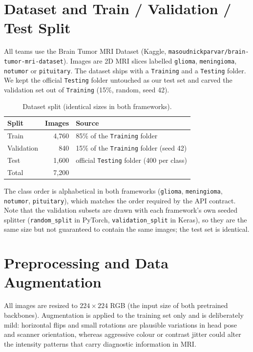 \documentclass[11pt,a4paper]{article}
\begin{document}
\section{Dataset and Train / Validation / Test Split}
All teams use the Brain Tumor MRI Dataset (Kaggle, \texttt{masoudnickparvar/brain-tumor-mri-dataset}). Images are 2D MRI slices labelled \texttt{glioma}, \texttt{meningioma}, \texttt{notumor} or \texttt{pituitary}. The dataset ships with a \texttt{Training} and a \texttt{Testing} folder. We kept the official \texttt{Testing} folder untouched as our test set and carved the validation set out of \texttt{Training} (15\%, random, seed 42).

\begin{table}[H]
\centering
\caption{Dataset split (identical sizes in both frameworks).}
\label{tab:split}
\begin{tabular}{lrl}
\toprule
Split & Images & Source \\
\midrule
Train      & 4{,}760 & 85\% of the \texttt{Training} folder \\
Validation &   840   & 15\% of the \texttt{Training} folder (seed 42) \\
Test       & 1{,}600 & official \texttt{Testing} folder (400 per class) \\
\midrule
Total      & 7{,}200 & \\
\bottomrule
\end{tabular}
\end{table}

\noindent The class order is alphabetical in both frameworks (\texttt{glioma}, \texttt{meningioma}, \texttt{notumor}, \texttt{pituitary}), which matches the order required by the API contract. Note that the validation subsets are drawn with each framework's own seeded splitter (\texttt{random\_split} in PyTorch, \texttt{validation\_split} in Keras), so they are the same size but not guaranteed to contain the same images; the test set is identical.

\section{Preprocessing and Data Augmentation}\label{sec:preproc}
All images are resized to $224\times224$ RGB (the input size of both pretrained backbones). Augmentation is applied to the training set only and is deliberately mild: horizontal flips and small rotations are plausible variations in head pose and scanner orientation, whereas aggressive colour or contrast jitter could alter the intensity patterns that carry diagnostic information in MRI.
\end{document}
